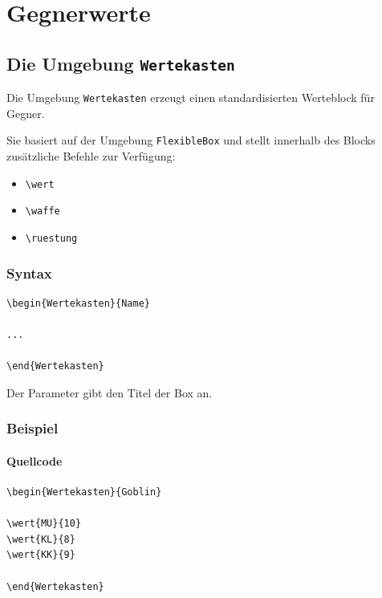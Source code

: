 \section{Gegnerwerte}

\subsection{Die Umgebung \texttt{Wertekasten}}

Die Umgebung \verb|Wertekasten| erzeugt einen standardisierten Werteblock
für Gegner.

Sie basiert auf der Umgebung \verb|FlexibleBox| und stellt innerhalb des
Blocks zusätzliche Befehle zur Verfügung:

\begin{itemize}
\item \verb|\wert|
\item \verb|\waffe|
\item \verb|\ruestung|
\end{itemize}

\subsubsection*{Syntax}

\begin{Verbatim}
\begin{Wertekasten}{Name}

...

\end{Wertekasten}
\end{Verbatim}

Der Parameter gibt den Titel der Box an.

\subsubsection*{Beispiel}

\paragraph{Quellcode}

\begin{Verbatim}
\begin{Wertekasten}{Goblin}

\wert{MU}{10}
\wert{KL}{8}
\wert{KK}{9}

\end{Wertekasten}
\end{Verbatim}

